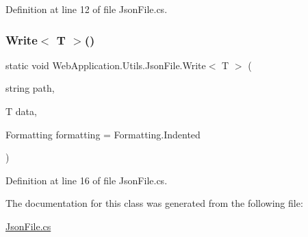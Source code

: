 Definition at line 12 of file Json\+File.\+cs.

\mbox{\label{classWebApplication_1_1Utils_1_1JsonFile_a2d4f23a606776d2a8d5f40a0532ab25b}} 
\subsubsection{\texorpdfstring{Write$<$ T $>$()}{Write< T >()}}
{\footnotesize\ttfamily static void Web\+Application.\+Utils.\+Json\+File.\+Write$<$ T $>$ (\begin{DoxyParamCaption}\item[{string}]{path,  }\item[{T}]{data,  }\item[{Formatting}]{formatting = {\ttfamily Formatting.Indented} }\end{DoxyParamCaption})\hspace{0.3cm}{\ttfamily [static]}}



Definition at line 16 of file Json\+File.\+cs.



The documentation for this class was generated from the following file\+:\begin{DoxyCompactItemize}
\item 
\mbox{\hyperlink{JsonFile_8cs}{Json\+File.\+cs}}\end{DoxyCompactItemize}
